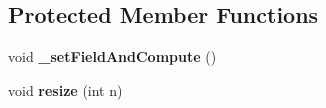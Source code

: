 \subsection*{Protected Member Functions}
\begin{DoxyCompactItemize}
\item 
\hypertarget{classvoom_1_1_l_b_f_g_s_b_a0a938b126b6ed24f099f55e01948130a}{
void {\bfseries \_\-setFieldAndCompute} ()}
\label{classvoom_1_1_l_b_f_g_s_b_a0a938b126b6ed24f099f55e01948130a}

\item 
\hypertarget{classvoom_1_1_l_b_f_g_s_b_aabf26f42cc7f41ac2f095599b5c71915}{
void {\bfseries resize} (int n)}
\label{classvoom_1_1_l_b_f_g_s_b_aabf26f42cc7f41ac2f095599b5c71915}

\end{DoxyCompactItemize}
